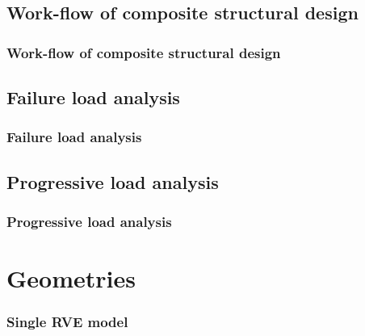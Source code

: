 \documentclass[first,firstsupp,lastsupp,handout,last,hyperref,table]{ETHclass}
\begin{document}
\subsection{Work-flow of composite structural design}

\begin{frame}
\frametitle{Work-flow of composite structural design}
\vspace{-0.75cm}
\centering
\begin{figure}
\centering

\label{fig:design_workflow}
\end{figure}
\end{frame}

\subsection{Failure load analysis}

\begin{frame}
\frametitle{Failure load analysis}
\vspace{-0.75cm}
\centering
\begin{figure}
\centering

\label{fig:failure_load_analysis}
\end{figure}
\centering

\end{frame}

\subsection{Progressive load analysis}

\begin{frame}
\frametitle{Progressive load analysis}
\vspace{-0.75cm}
\centering
\begin{figure}
\centering

\label{fig:progressive_load_analysis}
\end{figure}
\centering

\end{frame}

\section{Geometries}

\begin{frame}
\frametitle{Single RVE model}
\vspace{-0.5cm}
\centering
\begin{figure}[!h]
\centering
{}\quad
{}
  \label{fig:singleRVE_ccoc}
\end{figure}
\end{frame}
\end{document}
